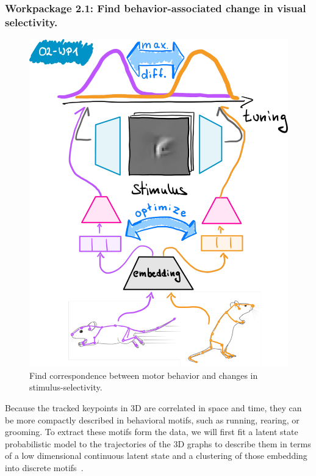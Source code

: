 \documentclass[B2,COG]{ercgrant}
\begin{document}
\subsubsection{Workpackage 2.1: Find behavior-associated change in visual selectivity.\hfill {}}
%
\begin{figure}
\vspace{-3ex}
\includegraphics[width=\linewidth]{figures/o2wp1.pdf}
\caption{Find correspondence between motor behavior and changes in stimulus-selectivity.\label{fig:o2wp1}}
\end{figure}
%
Because the tracked keypoints in 3D are correlated in space and time, they can be more compactly described in behavioral motifs, such as running, rearing, or grooming. 
To extract these motifs form the data, we will first fit a latent state probabilistic model to the trajectories of the 3D graphs to describe them in terms of a low dimensional continuous latent state and a clustering of those embedding into discrete motifs~\parencite[similar to][]{Wiltschko2015-ey, Wiltschko2020-zd}.
\end{document}
